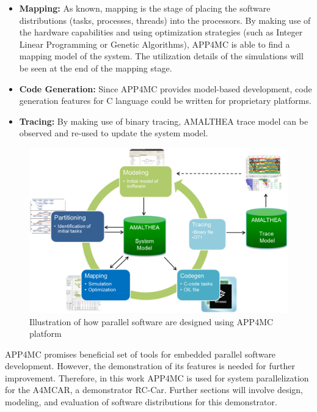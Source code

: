 \begin{itemize}
	\item \textbf{Mapping:} As known, mapping is the stage of placing the software distributions (tasks, processes, threads) into the processors. By making use of the hardware capabilities and using optimization strategies (such as Integer Linear Programming or Genetic Algorithms), APP4MC is able to find a mapping model of the system. The utilization details of the simulations will be seen at the end of the mapping stage.
	\item \textbf{Code Generation:} Since APP4MC provides model-based development, code generation features for C language could be written for proprietary platforms. 
	\item \textbf{Tracing:} By making use of binary tracing, AMALTHEA trace model can be observed and re-used to update the system model.
\end{itemize}

\begin{figure}[!ht]
	\centering
	\captionsetup{justification=centering}
	\includegraphics[width=\textwidth]{content/images/app4mcdesign.png}
	\caption{Illustration of how parallel software are designed using APP4MC platform \cite{amalthea4publicweb}}
	\label{fig:app4mcdesign}
\end{figure}
APP4MC promises beneficial set of tools for embedded parallel software development. However, the demonstration of its features is needed for further improvement. Therefore, in this work APP4MC is used for system parallelization for the A4MCAR, a demonstrator RC-Car. Further sections will involve design, modeling, and evaluation of software distributions for this demonstrator.

